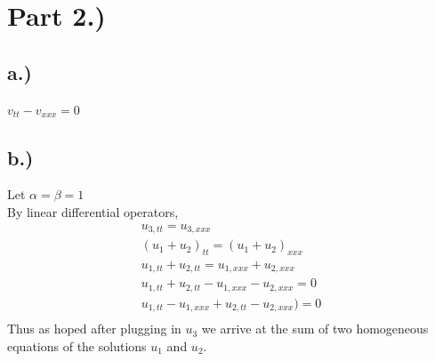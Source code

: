 \documentclass{article}
\begin{document}
\section*{Part 2.)}
\subsection*{a.)} 
$v_{tt} - v_{xxx} = 0$
\subsection*{b.)}
Let $\alpha = \beta = 1$\\

\noindent By linear differential operators, 
\begin{equation}
\begin{aligned}
u_{3, tt} = u_{3, xxx} \\
(u_{1} + u_{2})_{tt} = (u_{1} + u_{2})_{xxx}\\
u_{1, tt} + u_{2, tt} = u_{1, xxx} + u_{2, xxx}\\
u_{1, tt} + u_{2, tt} - u_{1, xxx} - u_{2, xxx} = 0\\
u_{1, tt} - u_{1, xxx} + u_{2, tt} - u_{2, xxx}) = 0\\
\end{aligned}
\end{equation}
Thus as hoped after plugging in $u_{3}$ we arrive at the sum of two homogeneous equations of the solutions $u_1$ and $u_2$.
\end{document}
